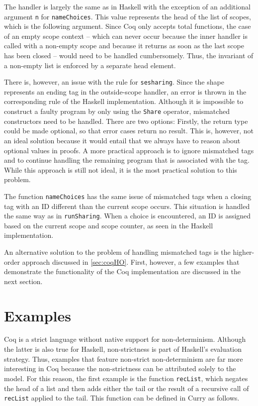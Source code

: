 \documentclass[a4paper, 11pt, fleqn, twoside]{scrreprt}
\newcommand{\hinl}[1]{\texttt{#1}}
\newcommand{\cinl}[1]{\texttt{#1}}
\begin{document}
The handler is largely the same as in Haskell with the exception of an additional argument \cinl{n} for \cinl{nameChoices}.
This value represents the head of the list of scopes, which is the following argument.
Since Coq only accepts total functions, the case of an empty scope context -- which can never occur because the inner handler is called with a non-empty scope and because it returns as soon as the last scope has been closed -- would need to be handled cumbersomely.
Thus, the invariant of a non-empty list is enforced by a separate head element.

There is, however, an issue with the rule for \cinl{sesharing}.
Since the shape represents an ending tag in the outside-scope handler, an error is thrown in the corresponding rule of the Haskell implementation.
Although it is impossible to construct a faulty program by only using the \cinl{Share} operator, mismatched constructors need to be handled.
There are two options: Firstly, the return type could be made optional, so that error cases return no result.
This is, however, not an ideal solution because it would entail that we always have to reason about optional values in proofs.
A more practical approach is to ignore mismatched tags and to continue handling the remaining program that is associated with the tag.
While this approach is still not ideal, it is the most practical solution to this problem.

The function \cinl{nameChoices} has the same issue of mismatched tags when a closing tag with an ID different than the current scope occurs.
This situation is handled the same way as in \cinl{runSharing}.
When a choice is encountered, an ID is assigned based on the current scope and scope counter, as seen in the Haskell implementation.

An alternative solution to the problem of handling mismatched tags is the higher-order approach discussed in \autoref{sec:coqHO}.
First, however, a few examples that demonstrate the functionality of the Coq implementation are discussed in the next section.

\section{Examples}
Coq is a strict language without native support for non-determinism.
Although the latter is also true for Haskell, non-strictness is part of Haskell's evaluation strategy.
Thus, examples that feature non-strict non-determinism are far more interesting in Coq because the non-strictness can be attributed solely to the model.
For this reason, the first example is the function \hinl{recList}, which negates the head of a list and then adds either the tail or the result of a recursive call of \hinl{recList} applied to the tail.
This function can be defined in Curry as follows. 
\end{document}
